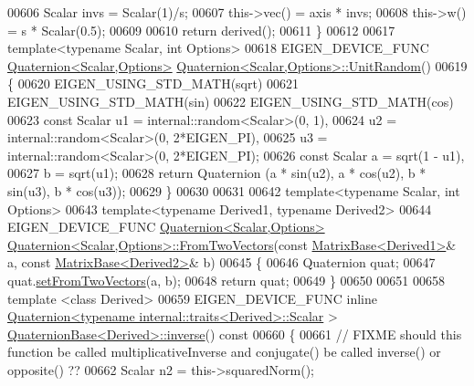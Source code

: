 \begin{DoxyCode}
{00606   Scalar invs = Scalar(1)/s;
00607   this->vec() = axis * invs;
00608   this->w() = s * Scalar(0.5);
00609 
00610   \textcolor{keywordflow}{return} derived();
00611 \}
00612 
00617 \textcolor{keyword}{template}<\textcolor{keyword}{typename} Scalar, \textcolor{keywordtype}{int} Options>
00618 EIGEN\_DEVICE\_FUNC \hyperlink{group___geometry___module_class_eigen_1_1_quaternion}{Quaternion<Scalar,Options>} 
      \hyperlink{group___geometry___module_a8a61f4092bc520c7291e5b5e16e80d71}{Quaternion<Scalar,Options>::UnitRandom}()
00619 \{
00620   EIGEN\_USING\_STD\_MATH(sqrt)
00621   EIGEN\_USING\_STD\_MATH(sin)
00622   EIGEN\_USING\_STD\_MATH(cos)
00623   \textcolor{keyword}{const} Scalar u1 = internal::random<Scalar>(0, 1),
00624                u2 = internal::random<Scalar>(0, 2*EIGEN\_PI),
00625                u3 = internal::random<Scalar>(0, 2*EIGEN\_PI);
00626   \textcolor{keyword}{const} Scalar a = sqrt(1 - u1),
00627                b = sqrt(u1);
00628   \textcolor{keywordflow}{return} Quaternion (a * sin(u2), a * cos(u2), b * sin(u3), b * cos(u3));
00629 \}
00630 
00631 
00642 \textcolor{keyword}{template}<\textcolor{keyword}{typename} Scalar, \textcolor{keywordtype}{int} Options>
00643 \textcolor{keyword}{template}<\textcolor{keyword}{typename} Derived1, \textcolor{keyword}{typename} Derived2>
00644 EIGEN\_DEVICE\_FUNC \hyperlink{group___geometry___module_class_eigen_1_1_quaternion}{Quaternion<Scalar,Options>} 
      \hyperlink{group___geometry___module_class_eigen_1_1_quaternion}{Quaternion<Scalar,Options>::FromTwoVectors}(\textcolor{keyword}{const} 
      \hyperlink{group___core___module_class_eigen_1_1_matrix_base}{MatrixBase<Derived1>}& a, \textcolor{keyword}{const} \hyperlink{group___core___module_class_eigen_1_1_matrix_base}{MatrixBase<Derived2>}& b)
00645 \{
00646     Quaternion quat;
00647     quat.\hyperlink{group___geometry___module_a61ce1b4b1faf6849c9663fd86e9b3a70}{setFromTwoVectors}(a, b);
00648     \textcolor{keywordflow}{return} quat;
00649 \}
00650 
00651 
00658 \textcolor{keyword}{template} <\textcolor{keyword}{class} Derived>
00659 EIGEN\_DEVICE\_FUNC \textcolor{keyword}{inline} \hyperlink{group___geometry___module_class_eigen_1_1_quaternion}{Quaternion<typename internal::traits<Derived>::Scalar}
      > \hyperlink{group___geometry___module_a6a1d8af1fe34cb4127f705c0d10ef649}{QuaternionBase<Derived>::inverse}()\textcolor{keyword}{ const}
00660 \textcolor{keyword}{}\{
00661   \textcolor{comment}{// FIXME should this function be called multiplicativeInverse and conjugate() be called inverse() or
       opposite()  ??}
00662   Scalar n2 = this->squaredNorm();
}
\end{DoxyCode}

